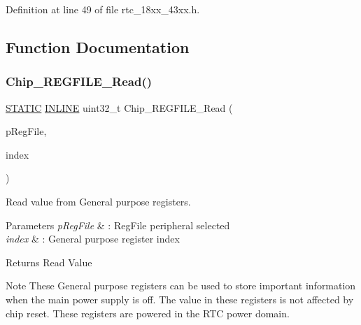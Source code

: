 Definition at line 49 of file rtc\+\_\+18xx\+\_\+43xx.\+h.



\subsection{Function Documentation}
\mbox{\label{group___r_t_c__18_x_x__43_x_x_gafdad7b4e551aa7e6d52b49a7a072f4ae}} 
\subsubsection{\texorpdfstring{Chip\+\_\+\+R\+E\+G\+F\+I\+L\+E\+\_\+\+Read()}{Chip\_REGFILE\_Read()}}
{\footnotesize\ttfamily \hyperlink{group___l_p_c___types___public___macros_ga10b2d890d871e1489bb02b7e70d9bdfb}{S\+T\+A\+T\+IC} \hyperlink{spifi__18xx__43xx_8h_a2eb6f9e0395b47b8d5e3eeae4fe0c116}{I\+N\+L\+I\+NE} uint32\+\_\+t Chip\+\_\+\+R\+E\+G\+F\+I\+L\+E\+\_\+\+Read (\begin{DoxyParamCaption}\item[{\hyperlink{struct_l_p_c___r_e_g_f_i_l_e___t}{L\+P\+C\+\_\+\+R\+E\+G\+F\+I\+L\+E\+\_\+T} $\ast$}]{p\+Reg\+File,  }\item[{uint8\+\_\+t}]{index }\end{DoxyParamCaption})}



Read value from General purpose registers. 


\begin{DoxyParams}{Parameters}
{\em p\+Reg\+File} & \+: Reg\+File peripheral selected \\
\hline
{\em index} & \+: General purpose register index \\
\hline
\end{DoxyParams}
\begin{DoxyReturn}{Returns}
Read Value 
\end{DoxyReturn}
\begin{DoxyNote}{Note}
These General purpose registers can be used to store important information when the main power supply is off. The value in these registers is not affected by chip reset. These registers are powered in the R\+TC power domain. 
\end{DoxyNote}


